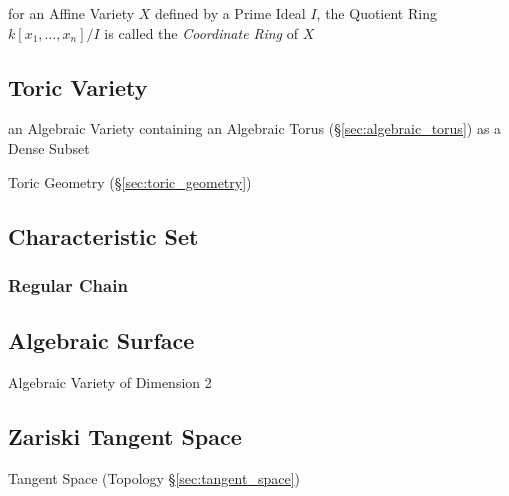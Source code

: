 for an Affine Variety $X$ defined by a Prime Ideal $I$, the Quotient Ring
$k[x_1,\ldots,x_n]/I$ is called the \emph{Coordinate Ring} of $X$



\subsection{Toric Variety}\label{sec:toric_variety}

an Algebraic Variety containing an Algebraic Torus (\S\ref{sec:algebraic_torus})
as a Dense Subset

\fist Toric Geometry (\S\ref{sec:toric_geometry})



\subsection{Characteristic Set}\label{sec:characteristic_set}

\subsubsection{Regular Chain}\label{sec:regular_chain}



\subsection{Algebraic Surface}\label{sec:algebraic_surface}

Algebraic Variety of Dimension 2



\subsection{Zariski Tangent Space}\label{sec:zariski_space}

Tangent Space (Topology \S\ref{sec:tangent_space})

